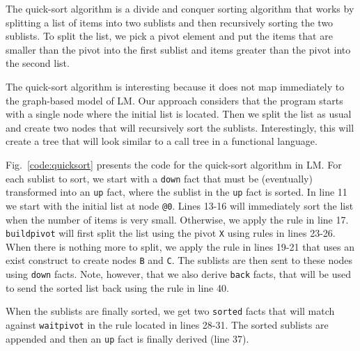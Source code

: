 The quick-sort algorithm is a divide and conquer sorting algorithm that works by splitting
a list of items into two sublists and then recursively sorting the two sublists.
To split the list, we pick a pivot element and put the items that are smaller than the pivot
into the first sublist and items greater than the pivot into the second list.

The quick-sort algorithm is interesting because it does not map immediately to the graph-based
model of LM. Our approach considers that the program starts with a single node where
the initial list is located. Then we split the list as usual and create two nodes
that will recursively sort the sublists. Interestingly, this will create a tree
that will look similar to a call tree in a functional language.

Fig.~\ref{code:quicksort} presents the code for the quick-sort algorithm in LM.
For each sublist to sort, we start with a \texttt{down} fact that must be (eventually)
transformed into an \texttt{up} fact, where the sublist in the \texttt{up} fact is sorted.
In line 11 we start with the initial list at node \texttt{@0}. Lines 13-16 will immediately
sort the list when the number of items is very small. Otherwise, we apply the rule in line 17.
\texttt{buildpivot} will first split the list using the pivot \texttt{X} using rules in
lines 23-26. When there is nothing more to split, we apply the rule in lines 19-21
that uses an exist construct to create nodes \texttt{B} and \texttt{C}. The sublists
are then sent to these nodes using \texttt{down} facts. Note, however, that we also
derive \texttt{back} facts, that will be used to send the sorted list back using the rule
in line 40.

When the sublists are finally sorted, we get two \texttt{sorted} facts that will match
against \texttt{waitpivot} in the rule located in lines 28-31. The sorted sublists
are appended and then an \texttt{up} fact is finally derived (line 37).


